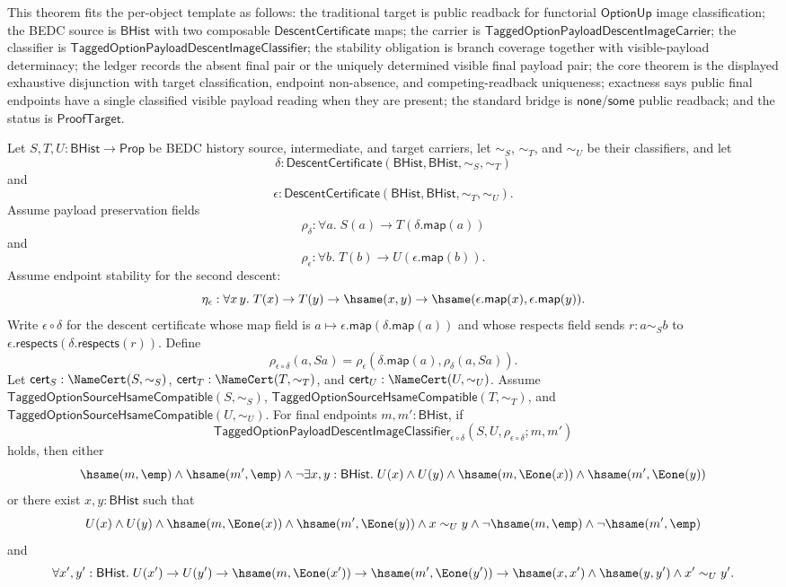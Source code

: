 \begin{theorem}
\label{thm:tagged-option-composite-image-classifier-public-readback-single-valuedness}
This theorem fits the per-object template as follows: the traditional target is
public readback for functorial $\mathsf{OptionUp}$ image classification; the
BEDC source is $\mathsf{BHist}$ with two composable
$\mathsf{DescentCertificate}$ maps; the carrier is
$\mathsf{TaggedOptionPayloadDescentImageCarrier}$; the classifier is
$\mathsf{TaggedOptionPayloadDescentImageClassifier}$; the stability obligation
is branch coverage together with visible-payload determinacy; the ledger records
the absent final pair or the uniquely determined visible final payload pair; the
core theorem is the displayed exhaustive disjunction with target classification,
endpoint non-absence, and competing-readback uniqueness; exactness says public
final endpoints have a single classified visible payload reading when they are
present; the standard bridge is $\mathsf{none}$/$\mathsf{some}$ public readback;
and the status is $\mathsf{ProofTarget}$.

Let $S,T,U:\mathsf{BHist}\to\mathsf{Prop}$ be BEDC history source,
intermediate, and target carriers, let $\sim_S$, $\sim_T$, and $\sim_U$ be their
classifiers, and let
$$
\delta:\mathsf{DescentCertificate}(\mathsf{BHist},\mathsf{BHist},\sim_S,\sim_T)
$$
and
$$
\epsilon:\mathsf{DescentCertificate}(\mathsf{BHist},\mathsf{BHist},\sim_T,\sim_U).
$$
Assume payload preservation fields
$$
\rho_{\delta}:\forall a.\;S(a)\to T(\delta.\mathsf{map}(a))
$$
and
$$
\rho_{\epsilon}:\forall b.\;T(b)\to U(\epsilon.\mathsf{map}(b)).
$$
Assume endpoint stability for the second descent:
$$
\eta_{\epsilon}:\forall x\,y.\;
T(x)\to T(y)\to \hsame(x,y)\to
\hsame(\epsilon.\mathsf{map}(x),\epsilon.\mathsf{map}(y)).
$$
Write $\epsilon\circ\delta$ for the descent certificate whose map field is
$a\mapsto\epsilon.\mathsf{map}(\delta.\mathsf{map}(a))$ and whose respects field
sends $r:a\sim_S b$ to
$\epsilon.\mathsf{respects}(\delta.\mathsf{respects}(r))$. Define
$$
\rho_{\epsilon\circ\delta}(a,Sa)=
\rho_{\epsilon}(\delta.\mathsf{map}(a),\rho_{\delta}(a,Sa)).
$$
Let $\mathsf{cert}_S:\NameCert(S,\sim_S)$,
$\mathsf{cert}_T:\NameCert(T,\sim_T)$, and
$\mathsf{cert}_U:\NameCert(U,\sim_U)$. Assume
$\mathsf{TaggedOptionSourceHsameCompatible}(S,\sim_S)$,
$\mathsf{TaggedOptionSourceHsameCompatible}(T,\sim_T)$, and
$\mathsf{TaggedOptionSourceHsameCompatible}(U,\sim_U)$. For final endpoints
$m,m':\mathsf{BHist}$, if
$$
\mathsf{TaggedOptionPayloadDescentImageClassifier}_{\epsilon\circ\delta}
(S,U,\rho_{\epsilon\circ\delta};m,m')
$$
holds, then either
$$
\hsame(m,\emp)\land \hsame(m',\emp)\land
\neg\exists x,y:\mathsf{BHist}.\;
U(x)\land U(y)\land
\hsame(m,\Eone(x))\land
\hsame(m',\Eone(y))
$$
or there exist $x,y:\mathsf{BHist}$ such that
$$
U(x)\land U(y)\land
\hsame(m,\Eone(x))\land
\hsame(m',\Eone(y))\land
x\sim_U y\land
\neg\hsame(m,\emp)\land
\neg\hsame(m',\emp)
$$
and
$$
\forall x',y':\mathsf{BHist}.\;
U(x')\to U(y')\to
\hsame(m,\Eone(x'))\to
\hsame(m',\Eone(y'))\to
\hsame(x,x')\land \hsame(y,y')\land x'\sim_U y'.
$$
\end{theorem}
